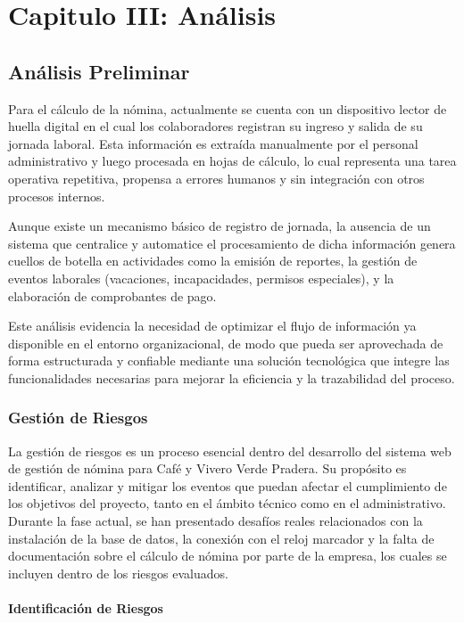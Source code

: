 \chapter{\textbf{Capitulo III: Análisis}}

\section{Análisis Preliminar}

Para el cálculo de la nómina, actualmente se cuenta con un dispositivo lector de huella digital en el cual los colaboradores registran su ingreso y salida de su jornada laboral. Esta información es extraída manualmente por el personal administrativo y luego procesada en hojas de cálculo, lo cual representa una tarea operativa repetitiva, propensa a errores humanos y sin integración con otros procesos internos.

Aunque existe un mecanismo básico de registro de jornada, la ausencia de un sistema que centralice y automatice el procesamiento de dicha información genera cuellos de botella en actividades como la emisión de reportes, la gestión de eventos laborales (vacaciones, incapacidades, permisos especiales), y la elaboración de comprobantes de pago.

Este análisis evidencia la necesidad de optimizar el flujo de información ya disponible en el entorno organizacional, de modo que pueda ser aprovechada de forma estructurada y confiable mediante una solución tecnológica que integre las funcionalidades necesarias para mejorar la eficiencia y la trazabilidad del proceso.

\subsection{Gestión de Riesgos}

La gestión de riesgos es un proceso esencial dentro del desarrollo del sistema web de gestión de nómina para Café y Vivero Verde Pradera. Su propósito es identificar, analizar y mitigar los eventos que puedan afectar el cumplimiento de los objetivos del proyecto, tanto en el ámbito técnico como en el administrativo.
Durante la fase actual, se han presentado desafíos reales relacionados con la instalación de la base de datos, la conexión con el reloj marcador y la falta de documentación sobre el cálculo de nómina por parte de la empresa, los cuales se incluyen dentro de los riesgos evaluados.

\subsubsection*{Identificación de Riesgos}


